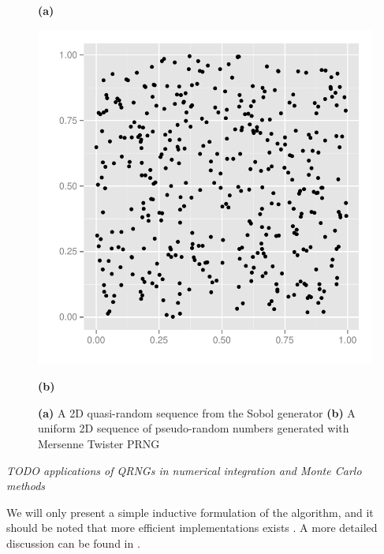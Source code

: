 \documentclass{llncs2e/llncs}
\begin{document}
\begin{figure}
\begin{minipage}{0.45\linewidth}
\begin{center}
      \hspace{0.55cm}\textbf{(a)}
    \end{center}
  \end{minipage}
  \begin{minipage}{0.45\linewidth}
    \begin{center}
      \includegraphics[width=\textwidth]{../report/graphics/2D-mersenne-sequence.pdf}

      \hspace{0.55cm}\textbf{(b)}
    \end{center}
  \end{minipage}

  \caption{\textbf{(a)} A 2D quasi-random sequence from the Sobol
    generator \textbf{(b)} A uniform 2D sequence of pseudo-random
    numbers generated with Mersenne Twister PRNG}
\label{fig:discrepancyplot}
\end{figure}

\emph{TODO applications of QRNGs in numerical integration and Monte Carlo methods}

We will only present a simple inductive formulation of the algorithm,
and it should be noted that more efficient implementations exists
\cite{bratley1988algorithm, hwy2011emerald}. A more detailed
discussion can be found in \cite{dybdalcarlsen2013thesis}.
\end{document}
